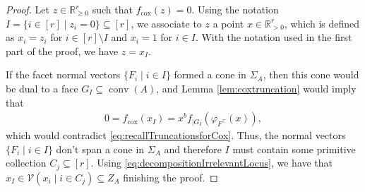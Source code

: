 \documentclass[10pt,a4paper]{amsart}
\DeclareMathOperator{\conv}{conv}
\newcommand{\RR}{\mathbb{R}}
\newcommand{\cox}{\mathrm{cox}}
\begin{document}
\begin{proof}
Let $z \in \RR_{\geq 0}^r$ such that $f_\cox(z) = 0$. Using the notation $I = \{ i \in [r] \mid z_i = 0\} \subseteq [r]$, we associate to $z$ a point $x \in \RR^r_{>0}$, which is defined as $x_i = z_i$ for $i \in [r] \setminus I$ and $x_i = 1$ for $i \in I$. With the notation used in the first part of the proof, we have $z = x_I$.

If the facet normal vectors $\{F_i \mid i \in I\}$ formed a cone in $\Sigma_A$, then this cone would be dual to a face $G_I \subseteq\conv(A)$, and Lemma \ref{lem:coxtruncation} would imply that \begin{align*}
        0=f_\cox(x_I) =x^b f_{|G_I}(\varphi_{F^\top}(x)),
    \end{align*}
    which would contradict \eqref{eq:recallTruncationsforCox}.
    Thus, the normal vectors $\{F_i \mid i \in I\}$ don't span a cone in $\Sigma_A$ and therefore $I$ must contain some primitive collection $C_j \subseteq [r]$. Using \eqref{eq:decompositionIrrelevantLocus}, we have that $x_I \in \mathcal{V}(x_i \mid i\in C_j)\subseteq Z_A$ finishing the proof. 
\end{proof}
\end{document}
